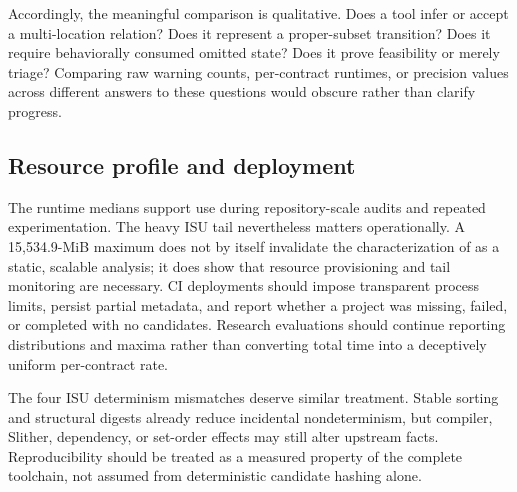 Accordingly, the meaningful comparison is qualitative. Does a tool infer or accept a multi-location relation? Does it represent a proper-subset transition? Does it require behaviorally consumed omitted state? Does it prove feasibility or merely triage? Comparing raw warning counts, per-contract runtimes, or precision values across different answers to these questions would obscure rather than clarify progress.

\subsection{Resource profile and deployment}
\label{s:discussion-resources}

The runtime medians support use during repository-scale audits and repeated experimentation. The heavy ISU tail nevertheless matters operationally. A 15,534.9-MiB maximum does not by itself invalidate the characterization of \sys as a static, scalable analysis; it does show that resource provisioning and tail monitoring are necessary. CI deployments should impose transparent process limits, persist partial metadata, and report whether a project was missing, failed, or completed with no candidates. Research evaluations should continue reporting distributions and maxima rather than converting total time into a deceptively uniform per-contract rate.

The four ISU determinism mismatches deserve similar treatment. Stable sorting and structural digests already reduce incidental nondeterminism, but compiler, Slither, dependency, or set-order effects may still alter upstream facts. Reproducibility should be treated as a measured property of the complete toolchain, not assumed from deterministic candidate hashing alone.
